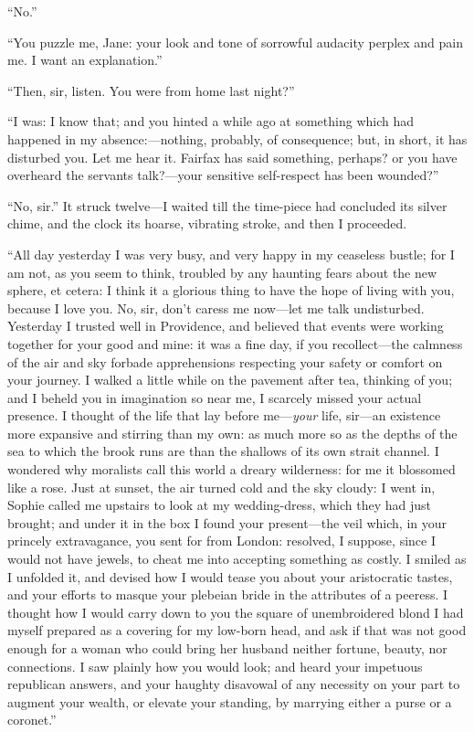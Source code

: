 \enquote{No.}

\enquote{You puzzle me, Jane: your look and tone of sorrowful audacity
	perplex and pain me.  I want an explanation.}

\enquote{Then, sir, listen.  You were from home last night?}

\enquote{I was: I know that; and you hinted a while ago at something
	which had happened in my absence:---nothing, probably, of consequence;
	but, in short, it has disturbed you.  Let me hear it.  \Mrs{} Fairfax has
	said something, perhaps? or you have overheard the servants talk?---your
	sensitive self-respect has been wounded?}

\enquote{No, sir.}  It struck twelve---I waited till the time-piece had
concluded its silver chime, and the clock its hoarse, vibrating stroke,
and then I proceeded.

\enquote{All day yesterday I was very busy, and very happy in my ceaseless
	bustle; for I am not, as you seem to think, troubled by any haunting
	fears about the new sphere, et cetera: I think it a glorious thing to
	have the hope of living with you, because I love you.  No, sir, don't
	caress me now---let me talk undisturbed.  Yesterday I trusted well in
	Providence, and believed that events were working together for your good
	and mine: it was a fine day, if you recollect---the calmness of the air
	and sky forbade apprehensions respecting your safety or comfort on your
	journey.  I walked a little while on the pavement after tea, thinking of
	you; and I beheld you in imagination so near me, I scarcely missed your
	actual presence.  I thought of the life that lay before me---\emph{your}
	life, sir---an existence more expansive and stirring than my own: as
	much more so as the depths of the sea to which the brook runs are than
	the shallows of its own strait channel.  I wondered why moralists call
	this world a dreary wilderness: for me it blossomed like a rose.  Just
	at sunset, the air turned cold and the sky cloudy: I went in, Sophie
	called me upstairs to look at my wedding-dress, which they had just
	brought; and under it in the box I found your present---the veil which,
	in your princely extravagance, you sent for from London: resolved, I
	suppose, since I would not have jewels, to cheat me into accepting
	something as costly.  I smiled as I unfolded it, and devised how I would
	tease you about your aristocratic tastes, and your efforts to masque
	your plebeian bride in the attributes of a peeress.  I thought how I
	would carry down to you the square of unembroidered blond I had myself
	prepared as a covering for my low-born head, and ask if that was not
	good enough for a woman who could bring her husband neither fortune,
	beauty, nor connections.  I saw plainly how you would look; and heard
	your impetuous republican answers, and your haughty disavowal of any
	necessity on your part to augment your wealth, or elevate your standing,
	by marrying either a purse or a coronet.}


